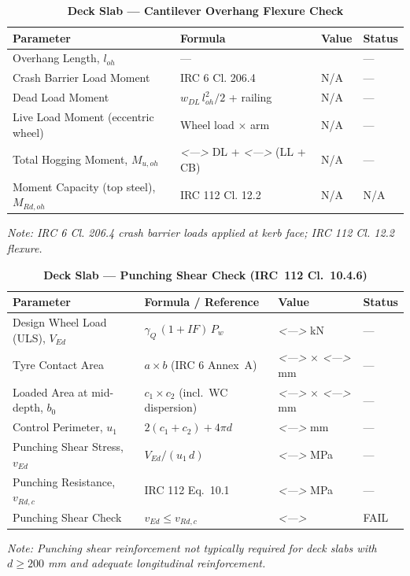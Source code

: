 \documentclass[12pt,a4paper]{report}
\numberwithin{table}{chapter}
\numberwithin{figure}{chapter}
\newcommand{\placeholder}[1]{\textit{\textless #1\textgreater}}
\begin{document}
\vspace{1em}
\begin{longtable}{|L{5.5cm}|C{3.5cm}|>{\centering\arraybackslash}p{4.5cm}|C{2cm}|}
\caption{\textbf{Deck Slab --- Cantilever Overhang Flexure Check}}\\
\hline
\textbf{Parameter} & \textbf{Formula} & \textbf{Value} & \textbf{Status} \\[6pt]
\hline
Overhang Length, $l_{oh}$ & --- &  & --- \\[6pt]
\hline
Crash Barrier Load Moment & IRC 6 Cl. 206.4 & N/A & --- \\[6pt]
\hline
Dead Load Moment & $w_{DL}\,l_{oh}^2/2$ + railing & N/A & --- \\[6pt]
\hline
Live Load Moment (eccentric wheel) & Wheel load $\times$ arm & N/A & --- \\[6pt]
\hline
Total Hogging Moment, $M_{u,oh}$ & \placeholder{---} DL + \placeholder{---} (LL + CB) & N/A & --- \\[6pt]
\hline
Moment Capacity (top steel), $M_{Rd,oh}$ & IRC 112 Cl. 12.2 & N/A & N/A \\[6pt]
\hline
\end{longtable}
\noindent\textit{Note: IRC 6 Cl. 206.4 crash barrier loads applied at kerb face; IRC 112 Cl. 12.2 flexure.}

\vspace{1em}
\begin{longtable}{|L{5.5cm}|C{3.5cm}|>{\centering\arraybackslash}p{4.5cm}|C{2cm}|}
\caption{\textbf{Deck Slab --- Punching Shear Check (IRC~112 Cl.~10.4.6)}}\\
\hline
\textbf{Parameter} & \textbf{Formula / Reference} & \textbf{Value} & \textbf{Status} \\[6pt]
\hline
Design Wheel Load (ULS), $V_{Ed}$ & $\gamma_Q\,(1+IF)\,P_w$ & \placeholder{---} kN & --- \\[6pt]
\hline
Tyre Contact Area & $a \times b$ (IRC 6 Annex~A) & \placeholder{---} $\times$ \placeholder{---} mm & --- \\[6pt]
\hline
Loaded Area at mid-depth, $b_0$ & $c_1 \times c_2$ (incl.\ WC dispersion) & \placeholder{---} $\times$ \placeholder{---} mm & --- \\[6pt]
\hline
Control Perimeter, $u_1$ & $2(c_1+c_2) + 4\pi d$ & \placeholder{---} mm & --- \\[6pt]
\hline
Punching Shear Stress, $v_{Ed}$ & $V_{Ed} / (u_1\,d)$ & \placeholder{---} MPa & --- \\[6pt]
\hline
Punching Resistance, $v_{Rd,c}$ & IRC 112 Eq.\ 10.1 & \placeholder{---} MPa & --- \\[6pt]
\hline
Punching Shear Check & $v_{Ed} \leq v_{Rd,c}$ & \placeholder{---} & FAIL \\[6pt]
\hline
\end{longtable}
\noindent\textit{Note: Punching shear reinforcement not typically required for deck slabs with $d \geq 200$ mm and adequate longitudinal reinforcement.}
\end{document}
